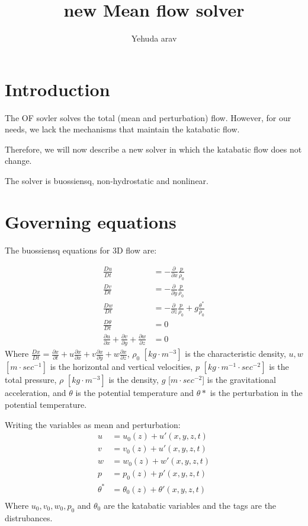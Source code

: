 \documentclass[a4paper,10pt]{article}
\title{new Mean flow solver}
\author{Yehuda arav}
\newcommand{\pd}[2]{\frac{\partial #1}{\partial #2}}
\newcommand{\Ddt}[1]{\pd{#1}{t} + u\pd{#1}{x} + v\pd{#1}{y} + w\pd{#1}{z}}
\newcommand{\DT}[1]{\frac{D #1}{Dt}}
\begin{document}
\maketitle

\section{Introduction}

The OF sovler solves the total (mean and perturbation) flow. However, for our needs, we lack the mechanisms 
that maintain the katabatic flow. 

Therefore, we will now describe a new solver in which the katabatic flow does not change. 

The solver is buossiensq, non-hydrostatic and nonlinear. 

\section{Governing equations}

The buossiensq equations for 3D flow are: 

\begin{equation}
  \begin{align}
    \DT{u} &= -\pd{\,}{x}\frac{p}{\rho_0} \\
    \DT{v} &= -\pd{\,}{y}\frac{p}{\rho_0} \\
    \DT{w} &= -\pd{\,}{z}\frac{p}{\rho_0} + g\frac{\theta^*}{\rho_0}\\
    \DT{\theta} &= 0\\
    \pd{u}{x}  + \pd{v}{y} + \pd{w}{z} &= 0    
  \end{align}
\end{equation}
Where $\DT{x}=\Ddt{x}$, $\rho_0$ $[kg\cdot m^{-3}]$ is the characteristic density, $u,w$ $[m\cdot sec^{-1}]$ is the horizontal and vertical velocities, 
$p$ $[kg\cdot m^{-1}\cdot sec^{-2}]$ is the total pressure, $\rho$ $[kg\cdot m^{-3}]$ is the density, $g$ [$m\cdot sec^{-2}$] is the gravitational acceleration, 
and $\theta$ is the potential temperature and $\theta*$ is the perturbation in the potential temperature. 

Writing the variables as mean and perturbation:
 \hspace{-5cm}
\begin{equation}
 \begin{align}
    u &= u_0(z) + u'(x,y,z,t)\\
    v &= v_0(z) + u'(x,y,z,t)\\
    w &= w_0(z) + w'(x,y,z,t)\\
    p &= p_0(z) + p'(x,y,z,t)\\
    \theta^*&=\theta_0(z) + \theta'(x,y,z,t)\\
 \end{align}
\end{equation}
Where $u_0,v_0,w_0,p_0$ and $\theta_0$ are the katabatic variables and the tags are the distrubances. 
\end{document}
